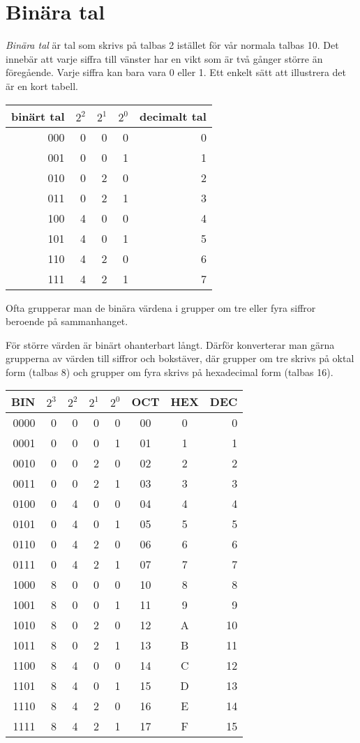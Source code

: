 \section{Binära tal}

\emph{Binära tal} är tal som skrivs på talbas 2 istället för vår normala
talbas 10.
Det innebär att varje siffra till vänster har en vikt som är två gånger större
än föregående.
Varje siffra kan bara vara 0 eller 1.
Ett enkelt sätt att illustrera det är en kort tabell.

\begin{center}
\begin{tabular}{r|rrr|r}
  binärt tal & \(2^2\) & \(2^1\) & \(2^0\) & decimalt tal \\ \hline
  000 & 0 & 0 & 0 & 0 \\
  001 & 0 & 0 & 1 & 1 \\
  010 & 0 & 2 & 0 & 2 \\
  011 & 0 & 2 & 1 & 3 \\
  100 & 4 & 0 & 0 & 4 \\
  101 & 4 & 0 & 1 & 5 \\
  110 & 4 & 2 & 0 & 6 \\
  111 & 4 & 2 & 1 & 7 \\
\end{tabular}
\end{center}

Ofta grupperar man de binära värdena i grupper om tre eller fyra siffror
beroende på sammanhanget.

För större värden är binärt ohanterbart långt.
Därför konverterar man gärna grupperna av värden till siffror och bokstäver,
där grupper om tre skrivs på oktal form (talbas 8) och grupper om fyra skrivs på 
hexadecimal form (talbas 16).

\begin{tabular}{r|rrrr|c|c|r}
  BIN & \(2^3\) & \(2^2\) & \(2^1\) & \(2^0\) & OCT & HEX & DEC\\ \hline
  0000 & 0 & 0 & 0 & 0 & 00 & 0 & 0 \\
  0001 & 0 & 0 & 0 & 1 & 01 & 1 & 1 \\
  0010 & 0 & 0 & 2 & 0 & 02 & 2 & 2 \\
  0011 & 0 & 0 & 2 & 1 & 03 & 3 & 3 \\
  0100 & 0 & 4 & 0 & 0 & 04 & 4 & 4 \\
  0101 & 0 & 4 & 0 & 1 & 05 & 5 & 5 \\
  0110 & 0 & 4 & 2 & 0 & 06 & 6 & 6 \\
  0111 & 0 & 4 & 2 & 1 & 07 & 7 & 7 \\
  1000 & 8 & 0 & 0 & 0 & 10 & 8 & 8 \\
  1001 & 8 & 0 & 0 & 1 & 11 & 9 & 9 \\
  1010 & 8 & 0 & 2 & 0 & 12 & A & 10 \\
  1011 & 8 & 0 & 2 & 1 & 13 & B & 11 \\
  1100 & 8 & 4 & 0 & 0 & 14 & C & 12 \\
  1101 & 8 & 4 & 0 & 1 & 15 & D & 13 \\
  1110 & 8 & 4 & 2 & 0 & 16 & E & 14 \\
  1111 & 8 & 4 & 2 & 1 & 17 & F & 15 \\
\end{tabular}
